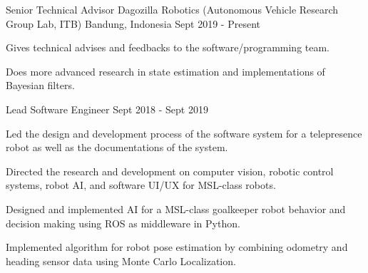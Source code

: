 

\begin{cventries}

    \cventry
    {Senior Technical Advisor} %
    {Dagozilla Robotics (Autonomous Vehicle Research Group Lab, ITB)} %
    {Bandung, Indonesia} %
    {Sept 2019 - Present} %
    {
        \begin{cvitems} %
            \item {Gives technical advises and feedbacks to the software/programming team.}
            \item {Does more advanced research in state estimation and implementations of Bayesian filters.}
        \end{cvitems}
    }

  \cventry
	{Lead Software Engineer} %
	{} %
	{} %
	{Sept 2018 - Sept 2019} %
	{
	  \begin{cvitems} %
	  	\item {Led the design and development process of the software system for a telepresence robot as well as the documentations of the system.}
		\item {Directed the research and development on computer vision, robotic control systems, robot AI, and software UI/UX for MSL-class robots.}
		\item {Designed and implemented AI for a MSL-class goalkeeper robot behavior and decision making using ROS as middleware in Python.}
		\item {Implemented algorithm for robot pose estimation by combining odometry and heading sensor data using Monte Carlo Localization.}
	  \end{cvitems}
	}


\end{cventries}
